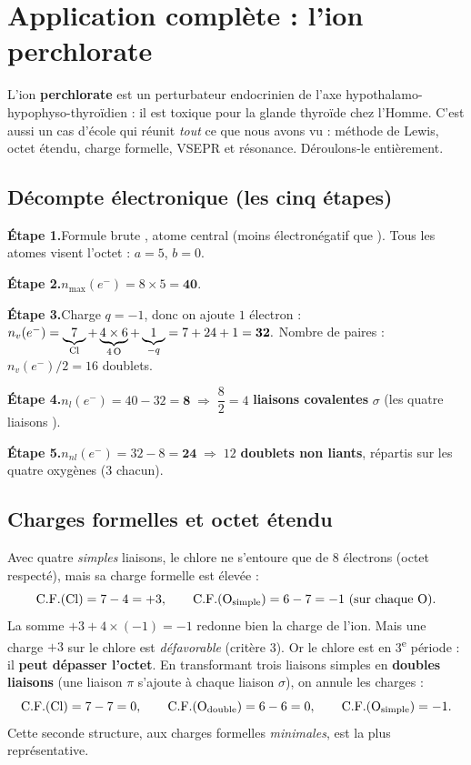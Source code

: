 \documentclass[11pt,a4paper]{article}
\newcommand{\nmax}{n_{\max}(e^{-})}
\newcommand{\nv}{n_{v}(e^{-})}
\newcommand{\nl}{n_{l}(e^{-})}
\newcommand{\nnl}{n_{nl}(e^{-})}
\newcommand{\CF}{\ensuremath{\mathrm{C.F.}}}
\begin{document}
\section{Application complète : l'ion perchlorate \texorpdfstring{}{ClO4-}}
\label{sec:perchlorate}

L'ion \textbf{perchlorate}  est un perturbateur endocrinien de l'axe
hypothalamo-hypophyso-thyroïdien : il est toxique pour la glande thyroïde chez l'Homme. C'est
aussi un cas d'école qui réunit \emph{tout} ce que nous avons vu : méthode de Lewis, octet
étendu, charge formelle, VSEPR et résonance. Déroulons-le entièrement.

\subsection{Décompte électronique (les cinq étapes)}

\begin{exemple}
\textbf{Étape 1.}\quad Formule brute , atome central  (moins électronégatif que
). Tous les atomes visent l'octet : $a=5$, $b=0$.

\smallskip
\textbf{Étape 2.}\quad $\nmax = 8\times 5 = \mathbf{40}.$

\smallskip
\textbf{Étape 3.}\quad Charge $q=-1$, donc on ajoute $1$ électron :
$\nv = \underbrace{7}_{\ce{Cl}} + \underbrace{4\times 6}_{4\,\ce{O}} + \underbrace{1}_{-q}
 = 7 + 24 + 1 = \mathbf{32}.$ \;
Nombre de paires : $\nv/2 = 16$ doublets.

\smallskip
\textbf{Étape 4.}\quad $\nl = 40 - 32 = \mathbf{8}\;\Rightarrow\;\dfrac{8}{2} = 4$ \textbf{liaisons
covalentes} $\sigma$ (les quatre liaisons ).

\smallskip
\textbf{Étape 5.}\quad $\nnl = 32 - 8 = \mathbf{24}\;\Rightarrow\;12$ \textbf{doublets non liants},
répartis sur les quatre oxygènes ($3$ chacun).
\end{exemple}

\subsection{Charges formelles et octet étendu}

Avec quatre \emph{simples} liaisons, le chlore ne s'entoure que de $8$ électrons (octet
respecté), mais sa charge formelle est élevée :
\[ \CF(\ce{Cl}) = 7 - 4 = +3, \qquad \CF(\ce{O}_{\text{simple}}) = 6 - 7 = -1\ \text{(sur chaque O)}. \]
La somme $+3 + 4\times(-1) = -1$ redonne bien la charge de l'ion. Mais une charge $+3$ sur le
chlore est \emph{défavorable} (critère 3). Or le chlore est en 3\textsuperscript{e} période : il
\textbf{peut dépasser l'octet}. En transformant trois liaisons simples en \textbf{doubles
liaisons} (une liaison $\pi$ s'ajoute à chaque liaison $\sigma$), on annule les charges :
\[ \CF(\ce{Cl}) = 7 - 7 = 0, \qquad \CF(\ce{O}_{\text{double}}) = 6 - 6 = 0, \qquad
   \CF(\ce{O}_{\text{simple}}) = -1. \]
Cette seconde structure, aux charges formelles \emph{minimales}, est la plus représentative.
\end{document}

